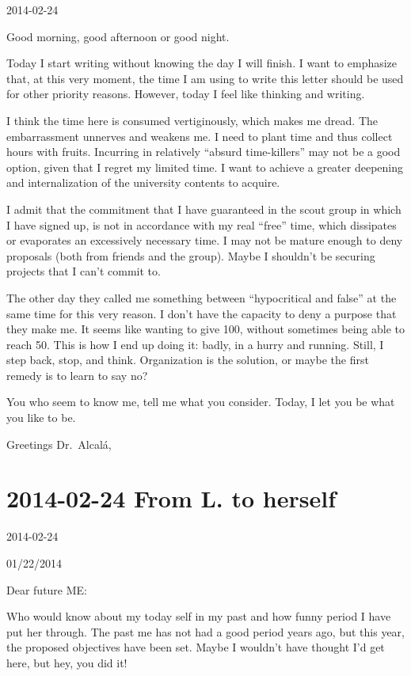 \documentclass[]{book}
\begin{document}
2014-02-24

Good morning, good afternoon or good night.

Today I start writing without knowing the day I will finish. I want to emphasize that, at this very moment, the time I am using to write this letter should be used for other priority reasons. However, today I feel like thinking and writing.

I think the time here is consumed vertiginously, which makes me dread. The embarrassment unnerves and weakens me. I need to plant time and thus collect hours with fruits. Incurring in relatively ``absurd time-killers'' may not be a good option, given that I regret my limited time. I want to achieve a greater deepening and internalization of the university contents to acquire.

I admit that the commitment that I have guaranteed in the scout group in which I have signed up, is not in accordance with my real ``free'' time, which dissipates or evaporates an excessively necessary time. I may not be mature enough to deny proposals (both from friends and the group). Maybe I shouldn't be securing projects that I can't commit to.

The other day they called me something between ``hypocritical and false'' at the same time for this very reason. I don't have the capacity to deny a purpose that they make me. It seems like wanting to give 100, without sometimes being able to reach 50. This is how I end up doing it: badly, in a hurry and running. Still, I step back, stop, and think. Organization is the solution, or maybe the first remedy is to learn to say no?

You who seem to know me, tell me what you consider. Today, I let you be what you like to be.

Greetings Dr.~Alcalá,

\hypertarget{fromL20140224}{%
\section*{2014-02-24 From L. to herself}\label{fromL20140224}}

2014-02-24

01/22/2014

Dear future ME:

Who would know about my today self in my past and how funny period I have put her through. The past me has not had a good period years ago, but this year, the proposed objectives have been set. Maybe I wouldn't have thought I'd get here, but hey, you did it!
\end{document}
